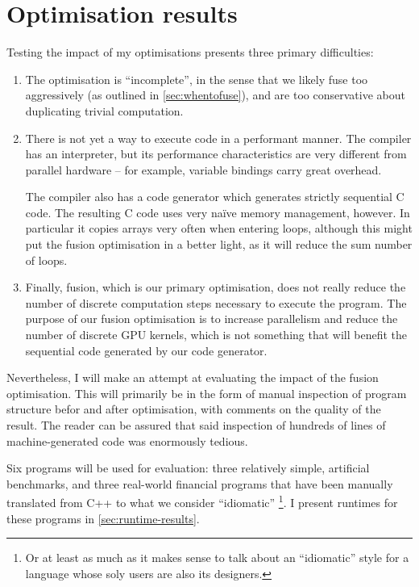 \chapter{Optimisation results}
\label{chap:optimisation-results}

Testing the impact of my optimisations presents three primary
difficulties:

\begin{enumerate}
\item The optimisation is ``incomplete'', in the sense that we likely
  fuse too aggressively (as outlined in \cref{sec:whentofuse}), and
  are too conservative about duplicating trivial computation.

\item There is not yet a way to execute \LO{} code in a performant
  manner.  The \LO{} compiler has an interpreter, but its performance
  characteristics are very different from parallel hardware -- for
  example, variable bindings carry great overhead.

  The compiler also has a code generator which generates strictly
  sequential C code.  The resulting C code uses very naïve memory
  management, however.  In particular it copies arrays very often when
  entering loops, although this might put the fusion optimisation in a
  better light, as it will reduce the sum number of loops.

\item Finally, fusion, which is our primary optimisation, does not
  really reduce the number of discrete computation steps necessary to
  execute the program.  The purpose of our fusion optimisation is to
  increase parallelism and reduce the number of discrete GPU kernels,
  which is not something that will benefit the sequential code
  generated by our code generator.
\end{enumerate}

Nevertheless, I will make an attempt at evaluating the impact of the
fusion optimisation.  This will primarily be in the form of manual
inspection of program structure befor and after optimisation, with
comments on the quality of the result.  The reader can be assured that
said inspection of hundreds of lines of machine-generated code was
enormously tedious.

Six programs will be used for evaluation: three relatively simple,
artificial benchmarks, and three real-world financial programs that
have been manually translated from C++ to what we consider
``idiomatic'' \LO{}\footnote{Or at least as much as it makes sense to
  talk about an ``idiomatic'' style for a language whose soly users
  are also its designers.}.  I present runtimes for these programs in
\cref{sec:runtime-results}.

